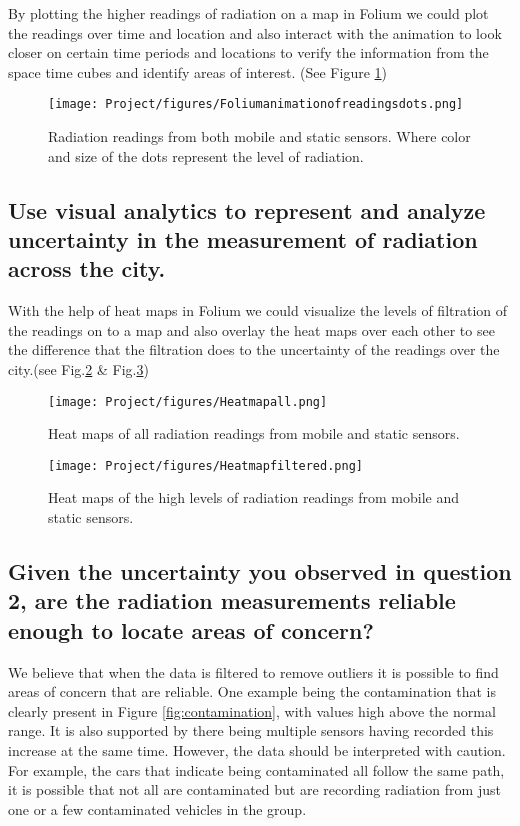 \documentclass[journal]{vgtc}                %
\begin{document}
By plotting the higher readings of radiation on a map in Folium we could plot the readings over time and location and also interact with the animation to look closer on certain time periods and locations to verify the information from the space time cubes and identify areas of interest. (See Figure \ref{fig:foliummap}) 

\begin{figure}[h!]
    \centering
    \texttt{[image: Project/figures/Foliumanimationofreadingsdots.png]}
    \caption{Radiation readings from both mobile and static sensors. Where color and size of the dots represent the level of radiation.}
    \label{fig:foliummap}
\end{figure}
\newpage
\subsection{Use visual analytics to represent and analyze uncertainty in the measurement of radiation across the city.}
With the help of heat maps in Folium we could visualize the levels of filtration of the readings on to a map and also overlay the heat maps over each other to see the difference that the filtration does to the uncertainty of the readings over the city.(see Fig.\ref{fig:foliummapheatmapall} & Fig.\ref{fig:foliummapheatmapfiltered})

\begin{figure}[h!]
    \centering
    \texttt{[image: Project/figures/Heatmapall.png]}
    \caption{Heat maps of all radiation readings from mobile and static sensors.}
    \label{fig:foliummapheatmapall}
\end{figure}

\begin{figure}[h!]
    \centering
    \texttt{[image: Project/figures/Heatmapfiltered.png]}
    \caption{Heat maps of the high levels of radiation readings from mobile and static sensors.}
    \label{fig:foliummapheatmapfiltered}
\end{figure}

\subsection{Given the uncertainty you observed in question 2, are the radiation measurements reliable enough to locate areas of concern?}

We believe that when the data is filtered to remove outliers it is possible to find areas of concern that are reliable. One example being the contamination that is clearly present in Figure \ref{fig:contamination}, with values high above the normal range. It is also supported by there being multiple sensors having recorded this increase at the same time. However, the data should be interpreted with caution. For example, the cars that indicate being contaminated all follow the same path, it is possible that not all are contaminated but are recording radiation from just one or a few contaminated vehicles in the group. 
\end{document}
